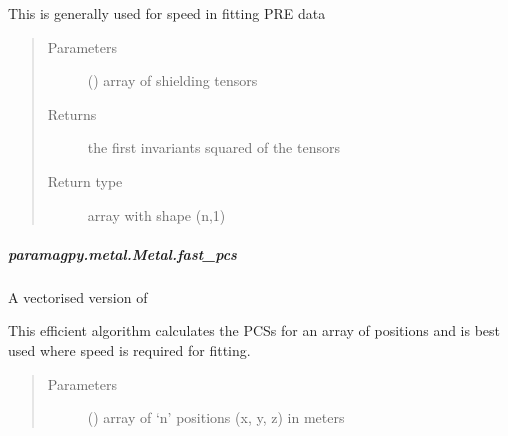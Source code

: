 \documentclass[a4paper,10pt,english]{sphinxmanual}
\begin{document}
\begin{fulllineitems}
\begin{fulllineitems}
\begin{fulllineitems}
This is generally used for speed in fitting PRE data
\begin{quote}\begin{description}
\item[{Parameters}] \leavevmode
{} (\sphinxstyleliteralemphasis{\sphinxupquote{ (}}\sphinxstyleliteralemphasis{\sphinxupquote{,}}\sphinxstyleliteralemphasis{\sphinxupquote{,}}\sphinxstyleliteralemphasis{\sphinxupquote{)}}) \textendash{} array of shielding tensors

\item[{Returns}] \leavevmode
{} \textendash{} the first invariants squared of the tensors

\item[{Return type}] \leavevmode
array with shape (n,1)

\end{description}\end{quote}

\end{fulllineitems}



\subparagraph{paramagpy.metal.Metal.fast\_pcs}
\label{\detokenize{reference/generated/paramagpy.metal.Metal.fast_pcs:paramagpy-metal-metal-fast-pcs}}\label{\detokenize{reference/generated/paramagpy.metal.Metal.fast_pcs::doc}}

\begin{fulllineitems}
\label{\detokenize{reference/generated/paramagpy.metal.Metal.fast_pcs:paramagpy.metal.Metal.fast_pcs}}
A vectorised version of {\hyperref[\detokenize{reference/generated/paramagpy.metal.Metal.pcs:paramagpy.metal.Metal.pcs}]{}}

This efficient algorithm calculates the PCSs for an array of
positions and is best used where speed is required for fitting.
\begin{quote}\begin{description}
\item[{Parameters}] \leavevmode
{} (\sphinxstyleliteralemphasis{\sphinxupquote{ (}}\sphinxstyleliteralemphasis{\sphinxupquote{,}}\sphinxstyleliteralemphasis{\sphinxupquote{)}}) \textendash{} array of ‘n’ positions (x, y, z) in meters


\end{description}
\end{quote}
\end{fulllineitems}
\end{fulllineitems}
\end{fulllineitems}
\end{document}
